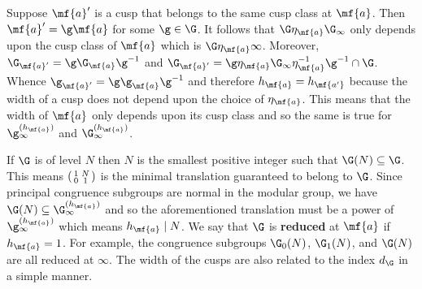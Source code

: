 \documentclass[12pt]{article}
\begin{document}
      \begin{remark}\label{rem:scaling_matrix_to_cusp_class}
        Suppose \(\mf{a}'\) is a cusp that belongs to the same cusp class at \(\mf{a}\). Then \(\mf{a}' = \g\mf{a}\) for some \(\g \in \G\). It follows that \(\G\eta_{\mf{a}}\G_{\infty}\) only depends upon the cusp class of \(\mf{a}\) which is \(\G\eta_{\mf{a}}\infty\). Moreover, \(\G_{\mf{a}'} = \g\G_{\mf{a}}\g^{-1}\) and \(\G_{\mf{a}'} = \g\eta_{\mf{a}}\G_{\infty}\eta_{\mf{a}}^{-1}\g^{-1} \cap \G\). Whence \(\g_{\mf{a}'} = \g\g_{\mf{a}}\g^{-1}\) and therefore \(h_{\mf{a}} = h_{\mf{a'}}\) because the width of a cusp does not depend upon the choice of \(\eta_{\mf{a}}\). This means that the width of \(\mf{a}\) only depends upon its cusp class and so the same is true for \(\g_{\infty}^{(h_{\mf{a}})}\) and \(\G_{\infty}^{(h_{\mf{a}})}\).
      \end{remark}
    
      If \(\G\) is of level \(N\) then \(N\) is the smallest positive integer such that \(\G(N) \subseteq \G\). This means \(\begin{psmallmatrix} 1 & N \\ 0 & 1 \end{psmallmatrix}\) is the minimal translation guaranteed to belong to \(\G\). Since principal congruence subgroups are normal in the modular group, we have \(\G(N) \subseteq \G_{\infty}^{(h_{\mf{a}})}\) and so the aforementioned translation must be a power of \(\g_{\infty}^{(h_{\mf{a}})}\) which means \(h_{\mf{a}} \mid N\). We say that \(\G\) is \textbf{reduced} at \(\mf{a}\) if \(h_{\mf{a}} = 1\). For example, the congruence subgroups \(\G_{0}(N)\), \(\G_{1}(N)\), and \(\G(N)\) are all reduced at \(\infty\). The width of the cusps are also related to the index \(d_{\G}\) in a simple manner.
\end{document}
